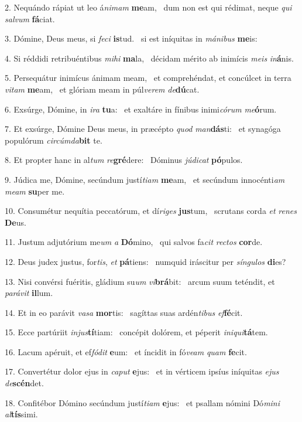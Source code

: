 2. Nequándo rápiat ut leo á\textit{ni}\textit{mam} \textbf{me}am, \ast\  dum non est qui rédimat, neque \textit{qui} \textit{sal}\textit{vum} \textbf{fá}ciat.\

3. Dómine, Deus meus, si \textit{fe}\textit{ci} \textbf{is}tud. \ast\  si est iníquitas in \textit{má}\textit{ni}\textit{bus} \textbf{me}is:\

4. Si réddidi retribuéntibus \textit{mi}\textit{hi} \textbf{ma}la, \ast\  décidam mérito ab inimícis \textit{me}\textit{is} \textit{in}\textbf{á}nis.\

5. Persequátur inimícus ánimam meam, \dag\  et comprehéndat, et concúlcet in terra \textit{vi}\textit{tam} \textbf{me}am, \ast\  et glóriam meam in púl\textit{ve}\textit{rem} \textit{de}\textbf{dú}cat.\

6. Exsúrge, Dómine, in \textit{i}\textit{ra} \textbf{tu}a: \ast\  et exaltáre in fínibus inimi\textit{có}\textit{rum} \textit{me}\textbf{ó}rum.\

7. Et exsúrge, Dómine Deus meus, in præcépto \textit{quod} \textit{man}\textbf{dás}ti: \ast\  et synagóga populórum \textit{cir}\textit{cúm}\textit{da}\textbf{bit} te.\

8. Et propter hanc in al\textit{tum} \textit{re}\textbf{gré}dere: \ast\  Dóminus \textit{jú}\textit{di}\textit{cat} \textbf{pó}pulos.\

9. Júdica me, Dómine, secúndum justí\textit{ti}\textit{am} \textbf{me}am, \ast\  et secúndum innocénti\textit{am} \textit{me}\textit{am} \textbf{su}per me.\

10. Consumétur nequítia peccatórum, et dí\textit{ri}\textit{ges} \textbf{jus}tum, \ast\  scrutans corda \textit{et} \textit{re}\textit{nes} \textbf{De}us.\

11. Justum adjutórium me\textit{um} \textit{a} \textbf{Dó}mino, \ast\  qui salvos fa\textit{cit} \textit{rec}\textit{tos} \textbf{cor}de.\

12. Deus judex justus, for\textit{tis}, \textit{et} \textbf{pá}tiens: \ast\  numquid iráscitur per \textit{sín}\textit{gu}\textit{los} \textbf{di}es?\

13. Nisi convérsi fuéritis, gládium su\textit{um} \textit{vi}\textbf{brá}bit: \ast\  arcum suum teténdit, et \textit{pa}\textit{rá}\textit{vit} \textbf{il}lum.\

14. Et in eo parávit \textit{va}\textit{sa} \textbf{mor}tis: \ast\  sagíttas suas ardén\textit{ti}\textit{bus} \textit{ef}\textbf{fé}cit.\

15. Ecce partúriit \textit{in}\textit{jus}\textbf{tí}tiam: \ast\  concépit dolórem, et péperit \textit{in}\textit{i}\textit{qui}\textbf{tá}tem.\

16. Lacum apéruit, et ef\textit{fó}\textit{dit} \textbf{e}um: \ast\  et íncidit in fó\textit{ve}\textit{am} \textit{quam} \textbf{fe}cit.\

17. Convertétur dolor ejus in \textit{ca}\textit{put} \textbf{e}jus: \ast\  et in vérticem ipsíus iníquitas \textit{e}\textit{jus} \textit{de}\textbf{scén}det.\

18. Confitébor Dómino secúndum justí\textit{ti}\textit{am} \textbf{e}jus: \ast\  et psallam nómini Dó\textit{mi}\textit{ni} \textit{al}\textbf{tís}simi.\

